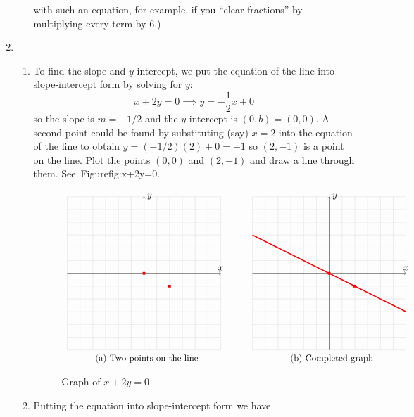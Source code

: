 \documentclass{article}
\newcommand{\ds}{\displaystyle}
\begin{document}
\begin{enumerate}
\begin{enumerate}
    with such an equation, for example, if you ``clear fractions'' by
    multiplying every term by $6$.)
  \end{enumerate}
\item %
  \begin{enumerate}
  \item %
    To find the slope and $y$-intercept, we put the equation of the
    line into slope-intercept form by solving for $y$:
    \begin{equation*}
      x+2y=0 \implies y = -\frac{1}{2} x + 0
    \end{equation*}
    so the slope is $m=-1/2$ and the $y$-intercept is $(0,b)=(0,0)$.
    A second point could be found by substituting (say) $x=2$ into the
    equation of the line to obtain $y=(-1/2)(2)+0 = -1$ so $(2,-1)$ is
    a point on the line.  Plot the points $(0,0)$ and $(2,-1)$ and
    draw a line through them.  See~Figure{fig:x+2y=0}.
    \begin{figure}[htbp]
      \centering
      $\begin{array}{c@{\hspace{1cm}}c}
        \begin{tikzpicture}[scale=0.5]
          \draw[lightgray,very thin] (-6,-6) grid (6,6);
          \draw[->] (-6,0)--(6,0) node[above]{$x$};
          \draw[->] (0,-6)--(0,6) node[right]{$y$};
          \node[fill=red,inner sep=1.5pt] (A) at (0,0) {};
          \node[fill=red,inner sep=1.5pt] (B) at (2,-1) {};
        \end{tikzpicture}
        &
        \begin{tikzpicture}[scale=0.5]
          \draw[lightgray,very thin] (-6,-6) grid (6,6);
          \draw[->] (-6,0)--(6,0) node[above]{$x$};
          \draw[->] (0,-6)--(0,6) node[right]{$y$};
          \draw[red,very thick] (-6,3)--(6,-3);
          \node[fill=red,inner sep=1.5pt] (A) at (0,0) {};
          \node[fill=red,inner sep=1.5pt] (B) at (2,-1) {};
        \end{tikzpicture}
        \\
        \mbox{(a) Two points on the line}
        &
        \mbox{(b) Completed graph}
      \end{array}$
      \caption{Graph of $x+2y=0$}
      \label{fig:x+2y=0}
    \end{figure}
  \item %
    Putting the equation into slope-intercept form we have

\end{enumerate}
\end{enumerate}
\end{document}
